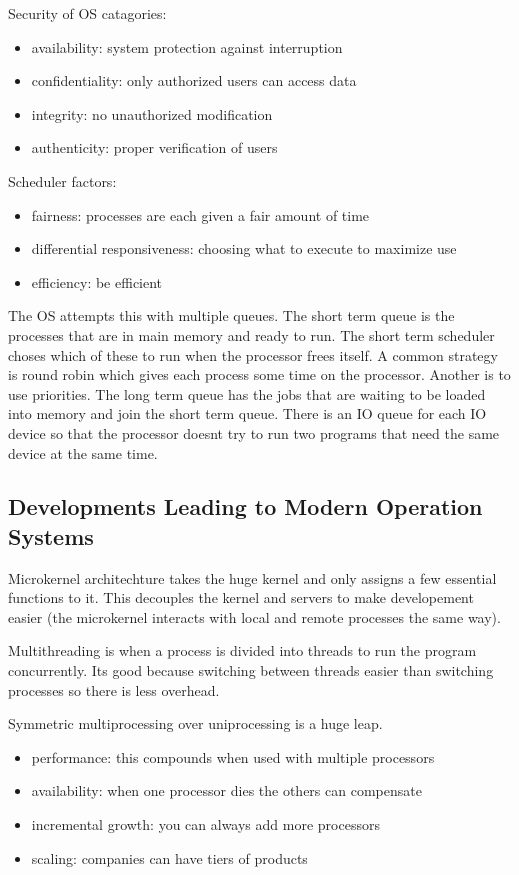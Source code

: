 \documentclass[12pt]{article}
\begin{document}
Security of OS catagories:
\begin{itemize}
    \item availability: system protection against interruption
    \item confidentiality: only authorized users can access data
    \item integrity: no unauthorized modification
    \item authenticity: proper verification of users
\end{itemize}

Scheduler factors:
\begin{itemize}
    \item fairness: processes are each given a fair amount of time
    \item differential responsiveness: choosing what to execute to maximize use
    \item efficiency: be efficient
\end{itemize}

The OS attempts this with multiple queues. The short term queue is the processes that are in main memory and ready to run. The short term scheduler choses which of these to run when the processor frees itself. A common strategy is round robin which gives each process some time on the processor. Another is to use priorities. The long term queue has the jobs that are waiting to be loaded into memory and join the short term queue. There is an IO queue for each IO device so that the processor doesnt try to run two programs that need the same device at the same time.


\subsection{Developments Leading to Modern Operation Systems}
Microkernel architechture takes the huge kernel and only assigns a few essential functions to it. This decouples the kernel and servers to make developement easier (the microkernel interacts with local and remote processes the same way).

Multithreading is when a process is divided into threads to run the program concurrently. Its good because switching between threads easier than switching processes so there is less overhead.

Symmetric multiprocessing over uniprocessing is a huge leap.
\begin{itemize}
    \item performance: this compounds when used with multiple processors
    \item availability: when one processor dies the others can compensate
    \item incremental growth: you can always add more processors
    \item scaling: companies can have tiers of products
\end{itemize}
\end{document}
